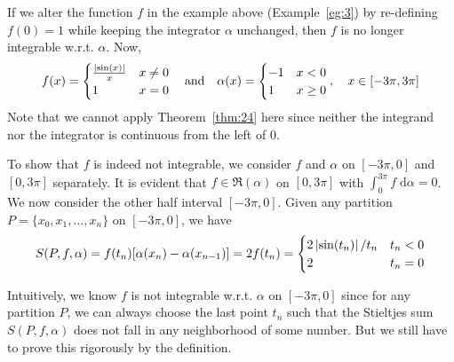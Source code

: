 \documentclass[thmcnt=section, 12pt]{my-elegantbook}
\begin{document}
\begin{example}
    If we alter the function $f$ in the example above (Example~\ref{eg:3}) by re-defining $f(0) = 1$ while keeping the integrator $\alpha$ unchanged, then $f$ is no longer integrable w.r.t. $\alpha$. Now, 
    \begin{align*}
        f(x) = \begin{cases}
            \frac{\left\lvert \sin(x) \right\rvert}{x} &x \neq 0 \\
            1 &x = 0
        \end{cases}
        \quad\text{and}\quad 
        \alpha(x) = \begin{cases}
            -1 &x < 0 \\
            1 &x \geq 0
        \end{cases},
        \quad x \in [-3\pi, 3\pi]
    \end{align*}
    Note that we cannot apply Theorem~\ref{thm:24} here since neither the integrand nor the integrator is continuous from the left of $0$.

    To show that $f$ is indeed not integrable, we consider $f$ and $\alpha$ on $[-3\pi, 0]$ and $[0, 3\pi]$ separately. It is evident that $f \in \mathfrak{R}(\alpha)$ on $[0, 3\pi]$ with $\int_{0}^{3\pi}f \; \mathrm{d}\alpha = 0$. We now consider the other half interval $[-3\pi, 0]$. Given any partition $P = \{x_0, x_1, \ldots, x_n\}$ on $[-3\pi, 0]$, we have 
    \begin{align*}
        S(P,f,\alpha)
        = f(t_n) [\alpha(x_n) - \alpha(x_{n-1})]
        = 2 f(t_n)
        = \begin{cases}
            2 \left\lvert \sin(t_n) \right\rvert / t_n &t_n < 0\\ 
            2 &t_n = 0
        \end{cases}
    \end{align*}

    \begin{note}
        Intuitively, we know $f$ is not integrable w.r.t. $\alpha$ on $[-3\pi, 0]$ since for any partition $P$, we can always choose the last point $t_n$ such that the Stieltjes sum $S(P,f,\alpha)$ does not fall in any neighborhood of some number. But we still have to prove this rigorously by the definition.
    \end{note}


\end{example}
\end{document}
